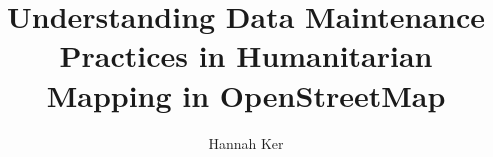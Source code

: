 \makeatletter
\renewcommand {\@degree@string} {Master Science}
\makeatother

\title{Understanding Data Maintenance Practices in Humanitarian Mapping in OpenStreetMap}
\author{Hannah Ker}

\maketitle